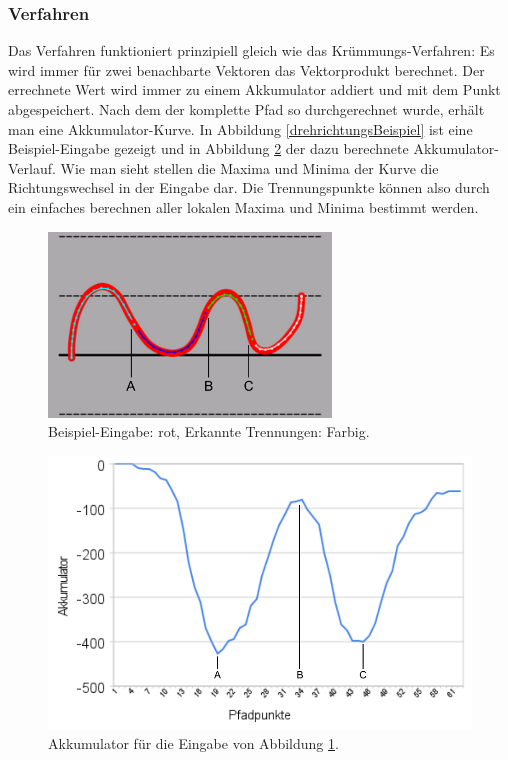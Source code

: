 \subsubsection{Verfahren}
Das Verfahren funktioniert prinzipiell gleich wie das Krümmungs-Verfahren: Es wird immer für zwei benachbarte Vektoren das Vektorprodukt berechnet. Der errechnete Wert wird immer zu einem Akkumulator addiert und mit dem Punkt abgespeichert. Nach dem der komplette Pfad so durchgerechnet wurde, erhält man eine Akkumulator-Kurve. In Abbildung \ref{drehrichtungsBeispiel} ist eine Beispiel-Eingabe gezeigt und in Abbildung \ref{akkumulatorDiagramm} der dazu berechnete Akkumulator-Verlauf. Wie man sieht stellen die Maxima und Minima der Kurve die Richtungswechsel in der Eingabe dar. Die Trennungspunkte können also durch ein einfaches berechnen aller lokalen Maxima und Minima bestimmt werden.

\begin{figure}[h!]
  \centering
    \includegraphics[width=0.67\textwidth]{./img/akkumulator_beispiel.pdf}
  \caption{Beispiel-Eingabe: rot, Erkannte Trennungen: Farbig.}
  \label{drehrichtungBeispiel}
\end{figure}

\begin{figure}[h!]
  \centering
    \includegraphics[width=1.0\textwidth]{./img/akkumulator_diagramm.pdf}
  \caption{Akkumulator für die Eingabe von Abbildung \ref{drehrichtungBeispiel}.}
  \label{akkumulatorDiagramm}
\end{figure}

